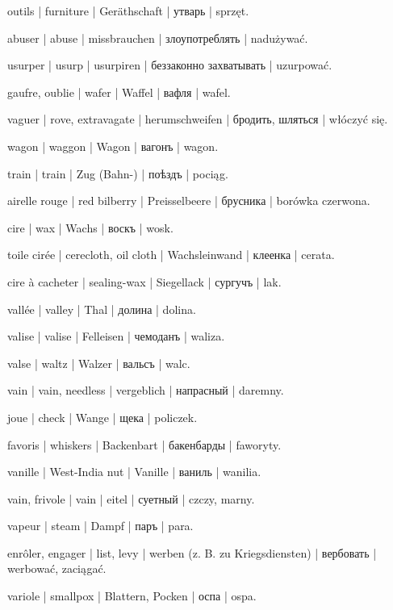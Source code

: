 \begin{outdent}{1em}
\uvsubentry{}
outils | furniture | Geräthschaft | утварь | sprzęt.


\uvsubentry{}
abuser | abuse | missbrauchen | злоупотреблять | nadużywać.

usurper | usurp | usurpiren | беззаконно захватывать | uzurpować.


gaufre, oublie | wafer | Waffel | вафля | wafel.

vaguer | rove, extravagate | herumschweifen | бродить, шляться | włóczyć się.

wagon | waggon | Wagon | вагонъ | wagon.

\uvsubentry{}
train | train | Zug (Bahn-) | поѣздъ | pociąg.

airelle rouge | red bilberry | Preisselbeere | брусника | borówka czerwona.

cire | wax | Wachs | воскъ | wosk.

\uvsubentry{}
toile cirée | cerecloth, oil cloth | Wachsleinwand | клеенка | cerata.


\uvsubentry{}
cire à cacheter | sealing-wax | Siegellack | сургучъ | lak.

vallée | valley | Thal | долина | dolina.

valise | valise | Felleisen | чемоданъ | waliza.

valse | waltz | Walzer | вальсъ | walc.

vain | vain, needless | vergeblich | напрасный | daremny.

joue | check | Wange | щека | policzek.

\uvsubentry{}
favoris | whiskers | Backenbart | бакенбарды | faworyty.

vanille | West-India nut | Vanille | ваниль | wanilia.

vain, frivole | vain | eitel | суетный | czczy, marny.

vapeur | steam | Dampf | паръ | para.

enrôler, engager | list, levy | werben (z. B. zu
Kriegsdiensten) | вербовать | werbować, zaciągać.

variole | smallpox | Blattern, Pocken | оспа | ospa.


\end{outdent}
